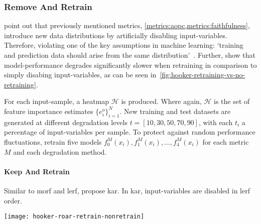 \subsubsection{Remove And Retrain}\label{metrics:roar}
\citeauthor{Hooker.2019} point out that previously mentioned metrics, \cref{metrics:aopc,metrics:faithfulness}, introduce new data distributions by artificially disabling input-variables. Therefore, violating one of the key assumptions in machine learning: `training and prediction data should arise from the same distribution'~\cite{McGaughey.2016}. Further, \citeauthor{Hooker.2019} show that model-performance degrades significantly slower when retraining in comparison to simply disabing input-variables, as can be seen in~\cref{fig:hooker-retraining-vs-no-retraining}.
\par
For each input-sample, a heatmap \(\mathscr H\) is produced. Where again,
\(\mathscr H\) is the set of feature importance estimates \( \{ e^{o}_{i} \}^N_{i=1} \). New training and test datasets are generated at different degradation levels \(t=\left[10, 30, 50, 70, 90 \right]\), with each \(t_i\) a percentage of input-variables per sample. To protect against random performance fluctuations, \citeauthor{Hooker.2019} retrain five models \(f_0^M(x_i), f_1^M(x_i),\ldots, f_4^M(x_i)\) for each metric \(M\) and each degradation method.

\paragraph{Keep And Retrain}
Similar to \gls{morf} and \gls{lerf}, \citeauthor{Hooker.2019} propose \gls{kar}. In \gls{kar}, input-variables are disabled in \gls{lerf} order.
\begin{figure*}[ht]
    \center{}
    \texttt{[image: hooker-roar-retrain-nonretrain]}
    \caption[The effect of retraining on model degredation in metrics.]{The figure shows the drastic decrease in model accuracy when disabling input-variables without retraining, but significantly smoothened when retraining is undertaken. Evaluated over Guided Backprop (GP), the unweighted gradient (GRAD), Integrated Gradients (IG) and random baseline.
    \textbf{Left:} evaluation of \gls{roar} without retraining. \textbf{Right:} evaluation of \gls{roar} with retraining. Adopted from~\cite{Hooker.2019}}\label{fig:hooker-retraining-vs-no-retraining}
\end{figure*}

